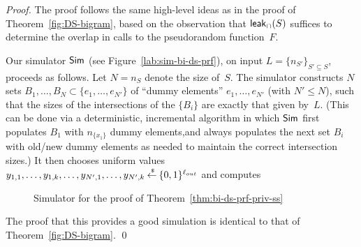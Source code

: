 \begin{proof}
The proof follows the same high-level ideas as in the proof of
Theorem~\ref{fig:DS-bigram}, based on the observation that ${\sf
leak}_\cap(S)$ suffices to determine the overlap in calls to the
pseudorandom function~$F$.

Our simulator ${\sf Sim}$ (see Figure~\ref{lab:sim-bi-ds-prf}), on input $L = \{n_{S'}\}_{S' \subseteq S}$,
proceeds as follows. Let $N = n_S$ denote the size of~$S$. The
simulator constructs $N$ sets $B_1, \ldots, B_N \subset \{e_1,
\ldots, e_{N'}\}$ of ``dummy elements'' $e_1, \ldots, e_{N'}$ (with
$N' \leq N$), such that the sizes of the intersections of the
$\{B_i\}$ are exactly that given by~$L$. (This can be done via a
deterministic, incremental algorithm in which ${\sf Sim}$ first populates
$B_1$ with $n_{\{x_1\}}$ dummy elements,and always populates the
next set $B_i$ with old/new dummy elements as needed to maintain the
correct intersection sizes.) It then chooses uniform values
$y_{1,1}, \ldots, y_{1,k}, \ldots, y_{N',1}, \ldots, y_{N',k} {\:\stackrel{{\scriptscriptstyle \hspace{0.2em}\$}} {\leftarrow}\:}
\{0,1\}^{\ell_{out}}$ and computes

\begin{figure}[th]
\centering
{}
\caption{Simulator for the proof of Theorem~\ref{thm:bi-ds-prf-priv-ss} }
\label{fig:sim-bi-ds-prf}
\end{figure}

The proof that this provides a good simulation is identical to that
of Theorem~\ref{fig:DS-bigram}. \hfill\qed
\end{proof}


